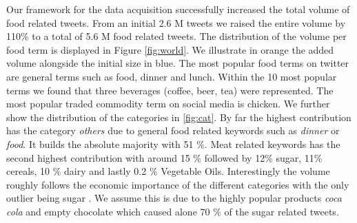 Our framework for the data acquisition successfully increased the total volume of food related tweets. From an initial 2.6 M tweets we raised the entire volume by 110\% to a total of 5.6 M food related tweets. The distribution of the volume per food term is displayed in Figure \ref{fig:world}. We illustrate in orange the added volume alongside the initial size in blue. The most popular food terms on twitter are general terms such as food, dinner and lunch. Within the 10 most popular terms we found that three beverages (coffee, beer, tea) were represented. The most popular traded commodity term on social media is chicken.  We further show the distribution of the categories in \ref{fig:cat}. By far the highest contribution has the category \emph{others} due to general food related keywords such as \emph{dinner} or \emph{food}. It builds the absolute majority with 51 \%. Meat related keywords has the second highest contribution with around 15 \% followed by 12\% sugar, 11\%  cereals, 10 \% dairy  and lastly 0.2 \% Vegetable Oils. Interestingly the volume roughly follows the economic importance of the different categories with the only outlier being sugar \cite{fao2008}. We assume this is due to the highly popular products \emph{coca cola} and empty	{chocolate} which caused alone 70 \% of the sugar related tweets. 




